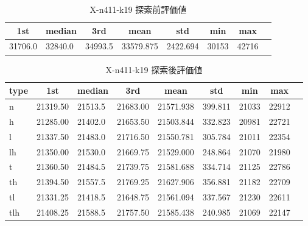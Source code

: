 \begin{table}[htbp]
    \caption{X-n411-k19 探索前評価値}
    \begin{tabular}{|l|l|l|l|l|l|l|l|}\hline
    \multicolumn{1}{|c|}{\textbf{1st}}
    &\multicolumn{1}{c|}{\textbf{median}}
    &\multicolumn{1}{c|}{\textbf{3rd}}
    &\multicolumn{1}{c|}{\textbf{mean}}
    &\multicolumn{1}{c|}{\textbf{std}}
    &\multicolumn{1}{c|}{\textbf{min}}
    &\multicolumn{1}{c|}{\textbf{max}}\\\hline
	31706.0 & 32840.0 & 34993.5 & 33579.875 & 2422.694 & 30153 & 42716\\\hline
	\end{tabular}
\end{table}
\begin{table}[htbp]
    \caption{X-n411-k19 探索後評価値}
    \begin{tabular}{|l|l|l|l|l|l|l|l|l|}\hline
    \multicolumn{1}{|c|}{\textbf{type}}
    &\multicolumn{1}{|c|}{\textbf{1st}}
    &\multicolumn{1}{c|}{\textbf{median}}
    &\multicolumn{1}{c|}{\textbf{3rd}}
    &\multicolumn{1}{c|}{\textbf{mean}}
    &\multicolumn{1}{c|}{\textbf{std}}
    &\multicolumn{1}{c|}{\textbf{min}}
    &\multicolumn{1}{c|}{\textbf{max}}\\\hline
	n & 21319.50 & 21513.5 & 21683.00 & 21571.938 & 399.811 & 21033 & 22912\\\hline
	h & 21285.00 & 21402.0 & 21653.50 & 21503.844 & 332.823 & 20981 & 22721\\\hline
	l & 21337.50 & 21483.0 & 21716.50 & 21550.781 & 305.784 & 21011 & 22354\\\hline
	lh & 21350.00 & 21530.0 & 21669.75 & 21529.000 & 248.864 & 21070 & 21980\\\hline
	t & 21360.50 & 21484.5 & 21739.75 & 21581.688 & 334.714 & 21125 & 22786\\\hline
	th & 21394.50 & 21557.5 & 21769.25 & 21627.906 & 356.881 & 21182 & 22709\\\hline
	tl & 21331.25 & 21418.5 & 21648.75 & 21561.094 & 337.567 & 21230 & 22611\\\hline
	tlh & 21408.25 & 21588.5 & 21757.50 & 21585.438 & 240.985 & 21069 & 22147\\\hline
	\end{tabular}
\end{table}
